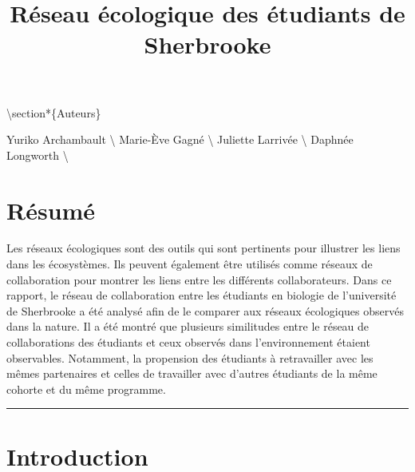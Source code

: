 \documentclass[9pt,twocolumn,twoside,]{pnas-new}
\title{Réseau écologique des étudiants de Sherbrooke}
\begin{document}
\verticaladjustment{-2pt}



\maketitle
\thispagestyle{firststyle}


\acknow{}

\textbackslash section*\{Auteurs\}

Yuriko Archambault \textbackslash{} Marie-Ève Gagné \textbackslash{}
Juliette Larrivée \textbackslash{} Daphnée Longworth \textbackslash{}

\hypertarget{ruxe9sumuxe9}{%
\section{Résumé}\label{ruxe9sumuxe9}}

Les réseaux écologiques sont des outils qui sont pertinents pour
illustrer les liens dans les écosystèmes. Ils peuvent également être
utilisés comme réseaux de collaboration pour montrer les liens entre les
différents collaborateurs. Dans ce rapport, le réseau de collaboration
entre les étudiants en biologie de l'université de Sherbrooke a été
analysé afin de le comparer aux réseaux écologiques observés dans la
nature. Il a été montré que plusieurs similitudes entre le réseau de
collaborations des étudiants et ceux observés dans l'environnement
étaient observables. Notamment, la propension des étudiants à
retravailler avec les mêmes partenaires et celles de travailler avec
d'autres étudiants de la même cohorte et du même programme.

\begin{center}\rule{0.5\linewidth}{0.5pt}\end{center}

\hypertarget{introduction}{%
\section{Introduction}\label{introduction}}
\end{document}
